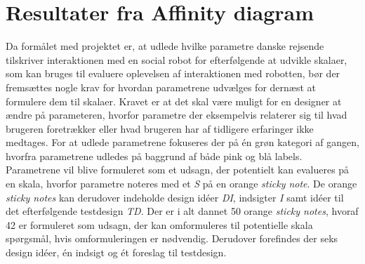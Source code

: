 \section{Resultater fra Affinity diagram}
\label{ParametreDatabehandlingAffinityDiagram}
%
%
Da formålet med projektet er, at udlede hvilke parametre danske rejsende tilskriver interaktionen med en social robot for efterfølgende at udvikle skalaer, som kan bruges til evaluere oplevelsen af interaktionen med robotten, bør der fremsættes nogle krav for hvordan parametrene udvælges for dernæst at formulere dem til skalaer. Kravet er at det skal være muligt for en designer at ændre på parameteren, hvorfor parametre der eksempelvis relaterer sig til hvad brugeren foretrækker eller hvad brugeren har af tidligere erfaringer ikke medtages. \blankline
%
For at udlede parametrene fokuseres der på én grøn kategori af gangen, hvorfra parametrene udledes på baggrund af både pink og blå labels. Parametrene vil blive formuleret som et udsagn, der potentielt kan evalueres på en skala, hvorfor parametre noteres med et \textit{S} på en orange \textit{sticky note}. De orange \textit{sticky notes} kan derudover indeholde design idéer \textit{DI}, indsigter \textit{I} samt idéer til det efterfølgende testdesign \textit{TD}. Der er i alt dannet 50 orange \textit{sticky notes}, hvoraf 42 er formuleret som udsagn, der kan omformuleres til potentielle skala spørgsmål, hvis omformuleringen er nødvendig. Derudover forefindes der seks design idéer, én indsigt og ét foreslag til testdesign.

